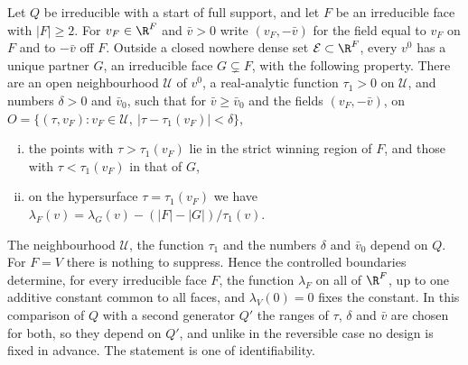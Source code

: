 \begin{lemma}\label{lem:exposure}
Let $Q$ be irreducible with a start of full support, and let $F$ be an
irreducible face with $|F|\ge2$. For $v_F\in\R^F$ and $\bar v>0$ write $(v_F,-\bar v)$
for the field equal to $v_F$ on $F$ and to $-\bar v$ off $F$. Outside a closed
nowhere dense set $\mathcal E\subset\R^F$, every $v^0$ has a unique partner
$G$, an irreducible face $G\subsetneq F$, with the following property. There are
an open neighbourhood $\mathcal U$ of $v^0$, a real-analytic function $\tau_1>0$ on $\mathcal U$,
and numbers $\delta>0$ and $\bar v_0$, such that for $\bar v\ge \bar v_0$ and the fields
$(v_F,-\bar v)$, on $O=\{(\tau,v_F):v_F\in \mathcal U,\ |\tau-\tau_1(v_F)|<\delta\}$,
\begin{enumerate}[(i)]
\item the points with $\tau>\tau_1(v_F)$ lie in the strict winning region of $F$,
and those with $\tau<\tau_1(v_F)$ in that of $G$,
\item on the hypersurface $\tau=\tau_1(v_F)$ we have
$\lambda_F(v)=\lambda_G(v)-(|F|-|G|)/\tau_1(v)$.
\end{enumerate}
The neighbourhood $\mathcal U$, the function $\tau_1$ and the numbers $\delta$
and $\bar v_0$ depend on $Q$.
For $F=V$ there is nothing to suppress. Hence the controlled boundaries
determine, for every irreducible face $F$, the function $\lambda_F$ on all of
$\R^F$, up to one additive constant common to all faces, and
$\lambda_V(0)=0$ fixes the constant. In this comparison of $Q$ with a second
generator $Q'$ the ranges of $\tau$, $\delta$ and $\bar v$ are chosen for both,
so they depend on $Q'$, and unlike in the reversible case no design is fixed in
advance. The statement is one of identifiability.
\end{lemma}


